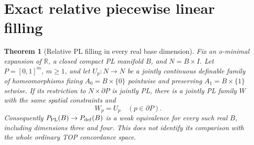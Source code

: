 \documentclass[11pt,a4paper]{article}
\newtheorem{theorem}{Theorem}[section]
\theoremstyle{definition}
\begin{document}
\section{Exact relative piecewise linear filling}
\begin{theorem}[Relative PL filling in every real base dimension]\label{result-42}
Fix an o-minimal expansion of $\mathbb R$, a closed compact PL
manifold $B$, and $N=B\times I$. Let $P=[0,1]^m$, $m\ge1$,
and let $U_p:N\to N$ be a jointly continuous definable family
of homeomorphisms fixing $A_0=B\times\{0\}$ pointwise and
preserving $A_1=B\times\{1\}$ setwise. If its restriction to
$N\times\partial P$ is jointly PL, there is a jointly PL
family $W$ with the same spatial constraints and
\begin{equation}
 W_p=U_p\quad(p\in\partial P).
 \label{equation-94}
\end{equation}
Consequently $P_{\rm PL}(B)\to P_{\rm def}(B)$ is a weak
equivalence for every such real $B$, including dimensions
three and four. This does not identify its comparison with
the whole ordinary TOP concordance space.
\end{theorem}
\end{document}
